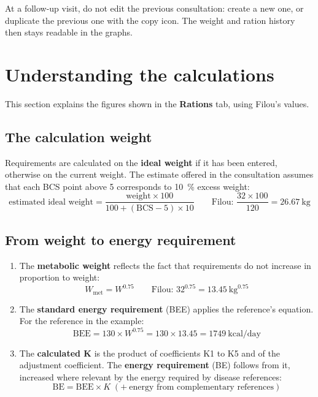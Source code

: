 \documentclass[11pt,a4paper]{article}
\newcommand{\ui}[1]{\textsf{\textbf{#1}}}
\begin{document}
\begin{aretenir}
At a follow-up visit, do not edit the previous consultation: create a new one, or duplicate the
previous one with the copy icon. The weight and ration history then stays readable in the
graphs.
\end{aretenir}

\section{Understanding the calculations}
\label{sec:calculs}

This section explains the figures shown in the \ui{Rations} tab, using Filou's values.

\subsection{The calculation weight}

Requirements are calculated on the \textbf{ideal weight} if it has been entered, otherwise on the
current weight. The estimate offered in the consultation assumes that each BCS point above 5
corresponds to 10~\% excess weight:
\[
  \text{estimated ideal weight} = \frac{\text{weight} \times 100}{100 + (\text{BCS} - 5) \times 10}
  \qquad\text{Filou: } \frac{32 \times 100}{120} = 26.67\ \text{kg}
\]

\subsection{From weight to energy requirement}

\begin{enumerate}
  \item The \textbf{metabolic weight} reflects the fact that requirements do not increase in
        proportion to weight:
        \[ W_{\text{met}} = W^{0.75} \qquad\text{Filou: } 32^{0.75} = 13.45\ \text{kg}^{0.75} \]
  \item The \textbf{standard energy requirement} (BEE) applies the reference's equation. For
        the reference in the example:
        \[ \text{BEE} = 130 \times W^{0.75} = 130 \times 13.45 = 1749\ \text{kcal/day} \]
  \item The \textbf{calculated K} is the product of coefficients K1 to K5 and of the adjustment
        coefficient. The \textbf{energy requirement} (BE) follows from it, increased where
        relevant by the energy required by disease references:
        \[ \text{BE} = \text{BEE} \times K \;(+\ \text{energy from complementary references}) \]
\end{enumerate}
\end{document}
